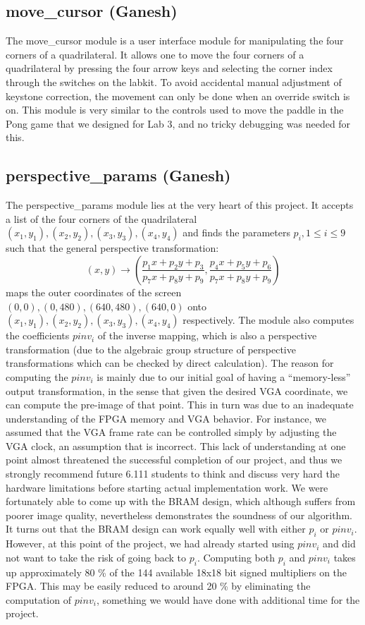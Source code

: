 \documentclass{article}
\begin{document}
\subsection{move\_cursor (Ganesh)}
The move\_cursor module is a user interface module for manipulating the four corners of a quadrilateral.
It allows one to move the four corners of a quadrilateral by pressing the four arrow keys and selecting the corner index through the switches on the labkit.
To avoid accidental manual adjustment of keystone correction,
the movement can only be done when an override switch is on.
This module is very similar to the controls used to move the paddle in the Pong game that we designed for Lab 3,
and no tricky debugging was needed for this.

\subsection{perspective\_params (Ganesh)}
The perspective\_params module lies at the very heart of this project.
It accepts a list of the four corners of the quadrilateral $(x_1, y_1), (x_2, y_2), (x_3, y_3), (x_4, y_4)$
and finds the parameters $p_i, 1 \leq i \leq 9$ such that the general perspective transformation:
\begin{equation}
\label{eqn:perspective_transform}
(x, y) \rightarrow \left( \frac{p_1 x + p_2 y + p_3}{p_7 x + p_8 y + p_9}, \frac{p_4 x + p_5 y + p_6}{p_7 x + p_8 y + p_9} \right)
\end{equation}
maps the outer coordinates of the screen $(0, 0), (0, 480), (640, 480), (640, 0)$ onto $(x_1, y_1), (x_2, y_2), (x_3, y_3), (x_4, y_4)$ respectively.
The module also computes the coefficients $pinv_i$ of the inverse mapping, which is also a perspective transformation
(due to the algebraic group structure of perspective transformations which can be checked by direct calculation).
The reason for computing the $pinv_i$ is mainly due to our initial goal of having a ``memory-less'' output transformation,
in the sense that given the desired VGA coordinate, we can compute the pre-image of that point.
This in turn was due to an inadequate understanding of the FPGA memory and VGA behavior.
For instance, we assumed that the VGA frame rate can be controlled simply by adjusting the VGA clock,
an assumption that is incorrect.
This lack of understanding at one point almost threatened the successful completion of our project,
and thus we strongly recommend future 6.111 students to think and discuss very hard the hardware limitations before starting actual implementation work.
We were fortunately able to come up with the BRAM design, which although suffers from poorer image quality,
nevertheless demonstrates the soundness of our algorithm.
It turns out that the BRAM design can work equally well with either $p_i$ or $pinv_i$.
However, at this point of the project, we had already started using $pinv_i$ and did not want to take the risk of going back to $p_i$.
Computing both $p_i$ and $pinv_i$ takes up approximately 80 \% of the 144 available 18x18 bit signed multipliers on the FPGA.
This may be easily reduced to around 20 \% by eliminating the computation of $pinv_i$,
something we would have done with additional time for the project.
\end{document}
